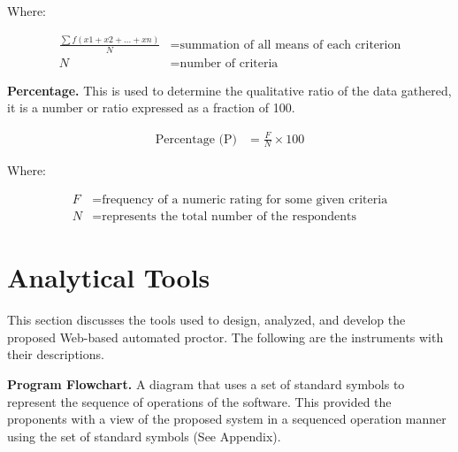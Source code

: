 Where:

\begin{equation*}
   \begin{split}
      \frac{\sum f(x1 + x2 + ... + xn)}{N} & = \text{summation of all means of each criterion} \\
      N & = \text{number of criteria}
   \end{split}
\end{equation*}

\textbf{Percentage.}
This is used to determine the qualitative ratio of the data gathered, it is a number or ratio expressed as a fraction of 100.

\begin{equation*}
   \begin{split}
      \text{Percentage (P)} & = \frac{F}{N} \times 100
   \end{split}
\end{equation*}

Where:

\begin{equation*}
   \begin{split}
      F & = \text{frequency of a numeric rating for some given criteria} \\
      N & = \text{represents the total number of the respondents}
   \end{split}
\end{equation*}

\section{Analytical Tools}

This section discusses the tools used to design, analyzed, and develop the proposed Web-based automated proctor.
The following are the instruments with their descriptions.

\textbf{Program Flowchart.}
A diagram that uses a set of standard symbols to represent the sequence of operations of the software.
This provided the proponents with a view of the proposed system in a sequenced operation manner using the set of standard symbols (See Appendix).


